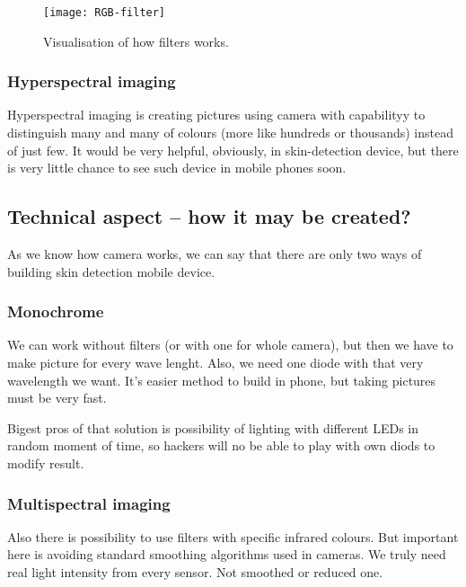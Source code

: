             \begin{figure}[H]
                \caption{Visualisation of how filters works.}
                \centering
                \texttt{[image: RGB-filter]}
                \label{fig:RGB-filter}
            \end{figure}

        \subsubsection*{Hyperspectral imaging}
            Hyperspectral imaging is creating pictures using camera with
            capabilityy to distinguish many and many of colours (more like hundreds or thousands)
            instead of just few.
            It would be very helpful, obviously, in skin-detection device,
            but there is very little chance to see such device in mobile phones soon.

    \subsection{Technical aspect -- how it may be created?}
        As we know how camera works, we can say that there are only two ways of
        building skin detection mobile device.
        \subsubsection*{Monochrome}
            We can work without filters (or with one for whole camera),
            but then we have to make picture for every wave lenght.
            Also, we need one diode with that very wavelength we want.
            It's easier method to build in phone, but taking pictures
            must be very fast.

            Bigest pros of that solution is possibility of lighting
            with different LEDs in random moment of time, so hackers
            will no be able to play with own diods to modify result.

        \subsubsection*{Multispectral imaging}
            Also there is possibility to use filters with specific infrared colours.
            But important here is avoiding standard smoothing algorithms used
            in cameras. We truly need real light intensity from every sensor.
            Not smoothed or reduced one.

